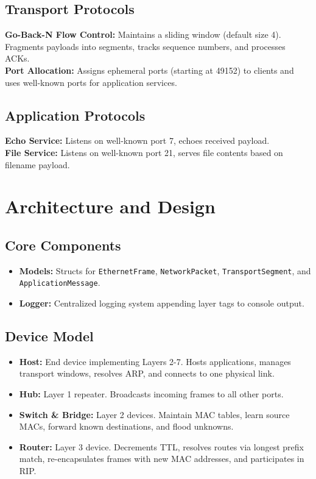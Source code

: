 \documentclass[12pt,a4paper]{article}
\begin{document}
\subsection{Transport Protocols}
\textbf{Go-Back-N Flow Control:} Maintains a sliding window (default size 4). Fragments payloads into segments, tracks sequence numbers, and processes ACKs. \\
\textbf{Port Allocation:} Assigns ephemeral ports (starting at 49152) to clients and uses well-known ports for application services.

\subsection{Application Protocols}
\textbf{Echo Service:} Listens on well-known port 7, echoes received payload. \\
\textbf{File Service:} Listens on well-known port 21, serves file contents based on filename payload.

\section{Architecture and Design}
\subsection{Core Components}
\begin{itemize}
    \item \textbf{Models:} Structs for \texttt{EthernetFrame}, \texttt{NetworkPacket}, \texttt{TransportSegment}, and \texttt{ApplicationMessage}.
    \item \textbf{Logger:} Centralized logging system appending layer tags to console output.
\end{itemize}

\subsection{Device Model}
\begin{itemize}
    \item \textbf{Host:} End device implementing Layers 2-7. Hosts applications, manages transport windows, resolves ARP, and connects to one physical link.
    \item \textbf{Hub:} Layer 1 repeater. Broadcasts incoming frames to all other ports.
    \item \textbf{Switch \& Bridge:} Layer 2 devices. Maintain MAC tables, learn source MACs, forward known destinations, and flood unknowns.
    \item \textbf{Router:} Layer 3 device. Decrements TTL, resolves routes via longest prefix match, re-encapsulates frames with new MAC addresses, and participates in RIP.
\end{itemize}
\end{document}

